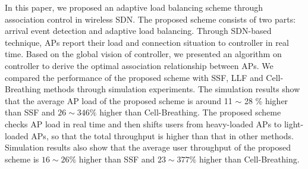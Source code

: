 In this paper, we proposed an adaptive load balancing scheme through association control in wireless SDN. 
The proposed scheme consists of two parts: arrival event detection and adaptive load balancing. 
Through SDN-based technique, APs report their load and connection situation to controller in real time. 
Based on the global vision of controller, we presented an algorithm on controller to derive the optimal association relationship between APs.
We compared the performance of the proposed scheme with SSF, LLF and Cell-Breathing methods through simulation experiments. 
The simulation results show that the average AP load of the proposed scheme is around 11 $\sim$ 28 \% higher than SSF and $26 \sim 346\%$ higher than Cell-Breathing. 
The proposed scheme checks AP load in real time and then shifts users from heavy-loaded APs to light-loaded APs, so that the total throughput is higher than that in other methods. 
Simulation results also show that the average user throughput of the proposed scheme is $16 \sim 26\%$ higher than SSF and $23 \sim 377\%$ higher than Cell-Breathing.

